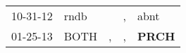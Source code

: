 \begin{supertabular}{p{0.07\textwidth}p{0.06\textwidth}p{0.02\textwidth}p{0.02\textwidth}p{0.06\textwidth}}
 10-31-12\textsuperscript{} &  rndb\textsuperscript{} &    &  , &           abnt\textsuperscript{} \\
 01-25-13\textsuperscript{} &  BOTH\textsuperscript{} &  , &  , &  \textbf{PRCH\textsuperscript{}} \\
\end{supertabular}
